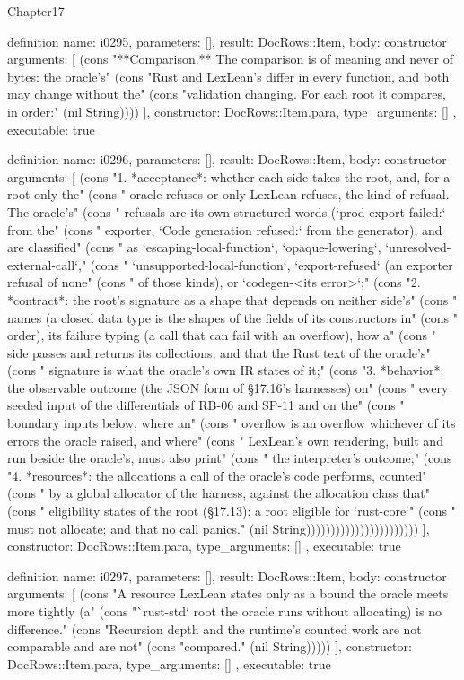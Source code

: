 \begin{lexlean}{Chapter17}
\begin{semanticmodule}
definition{
  name: i0295,
  parameters: [],
  result: DocRows::Item,
  body: constructor{
    arguments: [
      (cons "**Comparison.** The comparison is of meaning and never of bytes: the oracle's" (cons "Rust and LexLean's differ in every function, and both may change without the" (cons "validation changing. For each root it compares, in order:" (nil String))))
    ],
    constructor: DocRows::Item.para,
    type_arguments: []
  },
  executable: true
}

definition{
  name: i0296,
  parameters: [],
  result: DocRows::Item,
  body: constructor{
    arguments: [
      (cons "1. *acceptance*: whether each side takes the root, and, for a root only the" (cons "   oracle refuses or only LexLean refuses, the kind of refusal. The oracle's" (cons "   refusals are its own structured words (`prod-export failed:` from the" (cons "   exporter, `Code generation refused:` from the generator), and are classified" (cons "   as `escaping-local-function`, `opaque-lowering`, `unresolved-external-call`," (cons "   `unsupported-local-function`, `export-refused` (an exporter refusal of none" (cons "   of those kinds), or `codegen-<its error>`;" (cons "2. *contract*: the root's signature as a shape that depends on neither side's" (cons "   names (a closed data type is the shapes of the fields of its constructors in" (cons "   order), its failure typing (a call that can fail with an overflow), how a" (cons "   side passes and returns its collections, and that the Rust text of the oracle's" (cons "   signature is what the oracle's own IR states of it;" (cons "3. *behavior*: the observable outcome (the JSON form of §17.16's harnesses) on" (cons "   every seeded input of the differentials of RB-06 and SP-11 and on the" (cons "   boundary inputs below, where an" (cons "   overflow is an overflow whichever of its errors the oracle raised, and where" (cons "   LexLean's own rendering, built and run beside the oracle's, must also print" (cons "   the interpreter's outcome;" (cons "4. *resources*: the allocations a call of the oracle's code performs, counted" (cons "   by a global allocator of the harness, against the allocation class that" (cons "   eligibility states of the root (§17.13): a root eligible for `rust-core`" (cons "   must not allocate; and that no call panics." (nil String)))))))))))))))))))))))
    ],
    constructor: DocRows::Item.para,
    type_arguments: []
  },
  executable: true
}

definition{
  name: i0297,
  parameters: [],
  result: DocRows::Item,
  body: constructor{
    arguments: [
      (cons "A resource LexLean states only as a bound the oracle meets more tightly (a" (cons "`rust-std` root the oracle runs without allocating) is no difference." (cons "Recursion depth and the runtime's counted work are not comparable and are not" (cons "compared." (nil String)))))
    ],
    constructor: DocRows::Item.para,
    type_arguments: []
  },
  executable: true
}


\end{semanticmodule}
\end{lexlean}

